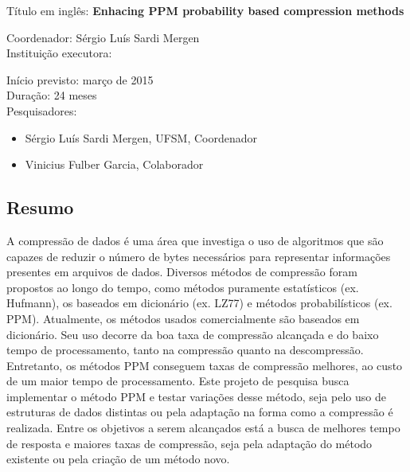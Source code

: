 \documentclass[a4paper,12pt,oneside]{article}
\newcommand{\engtitle}{Enhacing PPM probability based compression methods}
\newcommand{\edital}{nome do edital}
\begin{document}
\begin{otherlanguage}{english}
\noindent
Título em inglês: {\bf \engtitle}\\
\end{otherlanguage}

\noindent
Coordenador: Sérgio Luís Sardi Mergen\\

\noindent
Instituição executora: \ufsm \\


\noindent

\noindent
Início previsto: março de 2015 \\

\noindent
Duração: 24 meses \\

\noindent
Pesquisadores:
\begin{itemize}
\item Sérgio Luís Sardi Mergen, UFSM, Coordenador
\item Vinicius Fulber Garcia, Colaborador
\end{itemize}

\subsection{Resumo}

A compressão de dados é uma área que investiga o uso de algoritmos que são capazes de reduzir o número de bytes necessários para representar informações presentes em arquivos de dados. Diversos métodos de compressão foram propostos ao longo do tempo, como métodos puramente estatísticos (ex. Hufmann), os baseados em dicionário (ex. LZ77) e métodos probabilísticos (ex. PPM). Atualmente, os métodos usados comercialmente são baseados em dicionário. Seu uso decorre da boa taxa de compressão alcançada e do baixo tempo de processamento, tanto na compressão quanto na descompressão. Entretanto, os métodos PPM conseguem taxas de compressão melhores, ao custo de um maior tempo de processamento. Este projeto de pesquisa busca implementar o método PPM e testar variações desse método, seja pelo uso de estruturas de dados distintas ou pela adaptação na forma como a compressão é realizada. Entre os objetivos a serem alcançados está a busca de melhores tempo de resposta e maiores taxas de compressão, seja pela adaptação do método existente ou pela criação de um método novo.  
\end{document}
